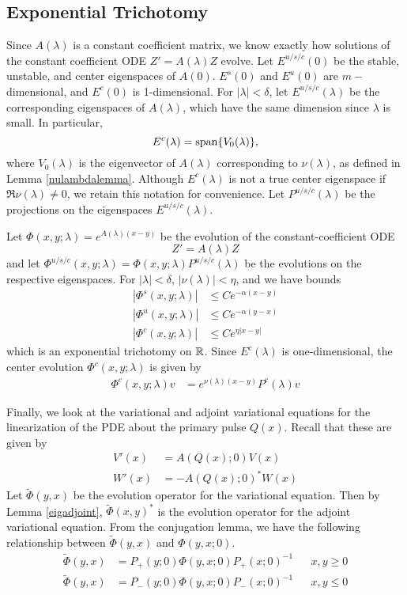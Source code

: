 \documentclass[thesis.tex]{subfiles}
\begin{document}
\subsection{Exponential Trichotomy}

Since $A(\lambda)$ is a constant coefficient matrix, we know exactly how solutions of the constant coefficient ODE $Z' = A(\lambda)Z$ evolve. Let $E^{u/s/c}(0)$ be the stable, unstable, and center eigenspaces of $A(0)$. $E^s(0)$ and $E^u(0)$ are $m-$dimensional, and $E^c(0)$ is 1-dimensional. For $|\lambda| < \delta$, let $E^{u/s/c}(\lambda)$ be the corresponding eigenspaces of $A(\lambda)$, which have the same dimension since $\lambda$ is small. In particular, 
\[
E^c(\lambda) = \operatorname{span}\{ V_0(\lambda) \},
\]
where $V_0(\lambda)$ is the eigenvector of $A(\lambda)$ corresponding to $\nu(\lambda)$, as defined in Lemma \ref{nulambdalemma}. Although $E^c(\lambda)$ is not a true center eigenspace if $\Re \nu(\lambda) \neq 0$, we retain this notation for convenience. Let $P^{u/s/c}(\lambda)$ be the projections on the eigenspaces $E^{u/s/c}(\lambda)$. 

Let $\Phi(x, y; \lambda) = e^{A(\lambda)(x-y)}$ be the evolution of the constant-coefficient ODE
\[
Z' = A(\lambda) Z
\]
and let $\Phi^{u/s/c}(x, y; \lambda) = \Phi(x, y; \lambda)P^{u/s/c}(\lambda)$ be the evolutions on the respective eigenspaces. For $|\lambda| < \delta$, $|\nu(\lambda)| < \eta$, and we have bounds
\begin{equation}\label{Zevolbounds}
\begin{aligned}
|\Phi^s(x, y; \lambda)| &\leq C e^{-\alpha(x - y)} \\
|\Phi^u(x, y; \lambda)| &\leq C e^{-\alpha(y - x)} \\
|\Phi^c(x, y; \lambda)| &\leq C e^{\eta|x - y|} 
\end{aligned}
\end{equation}
which is an exponential trichotomy on $\mathbb{R}$. Since $E^c(\lambda)$ is one-dimensional, the center evolution $\Phi^c(x, y; \lambda)$ is given by
\begin{align}\label{centerevol}
\Phi^c(x, y; \lambda) v &= e^{\nu(\lambda)(x - y)} P^c(\lambda)v
\end{align}

Finally, we look at the variational and adjoint variational equations for the linearization of the PDE about the primary pulse $Q(x)$. Recall that these are given by 
\begin{align*}
V'(x) &= A(Q(x); 0) V(x) \\
W'(x) &= -A(Q(x); 0)^* W(x)
\end{align*}
Let $\tilde{\Phi}(y, x)$ be the evolution operator for the variational equation. Then by Lemma \ref{eigadjoint}, $\tilde{\Phi}(x, y)^*$ is the evolution operator for the adjoint variational equation. From the conjugation lemma, we have the following relationship between $\tilde{\Phi}(y, x)$ and $\Phi(y, x; 0)$.
\begin{align*}
\tilde{\Phi}(y, x) &= P_+(y; 0) \Phi(y, x; 0) P_+(x; 0)^{-1} && x, y \geq 0 \\
\tilde{\Phi}(y, x) &= P_-(y; 0) \Phi(y, x; 0) P_-(x; 0)^{-1} && x, y \leq 0
\end{align*}
\end{document}
